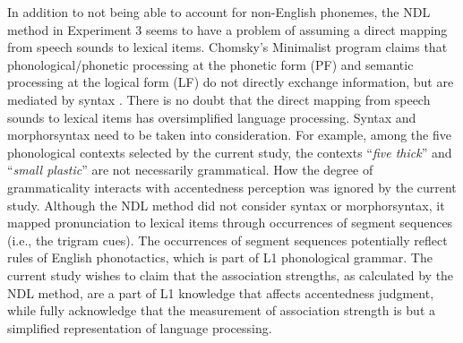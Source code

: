 In addition to not being able to account for non-English phonemes, the NDL method in Experiment 3 seems to have a problem of assuming a direct mapping from speech sounds to lexical items. Chomsky’s Minimalist program claims that phonological/phonetic processing at the phonetic form (PF) and semantic processing at the logical form (LF) do not directly exchange information, but are mediated by syntax \citep{Chomsky_1995}. There is no doubt that the direct mapping from speech sounds to lexical items has oversimplified language processing. Syntax and morphorsyntax need to be taken into consideration. For example, among the five phonological contexts selected by the current study, the contexts “\textit{five thick}” and “\textit{small plastic}” are not necessarily grammatical. How the degree of grammaticality interacts with accentedness perception was ignored by the current study. Although the NDL method did not consider syntax or morphorsyntax, it mapped pronunciation to lexical items through occurrences of segment sequences (i.e., the trigram cues). The occurrences of segment sequences potentially reflect rules of English phonotactics, which is part of L1 phonological grammar. The current study wishes to claim that the association strengths, as calculated by the NDL method, are a part of L1 knowledge that affects accentedness judgment, while fully acknowledge that the measurement of association strength is but a simplified representation of language processing.




